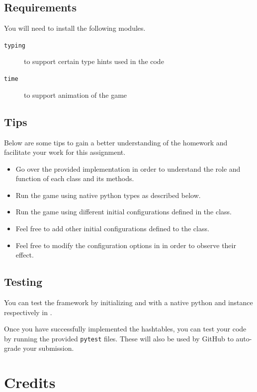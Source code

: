 \documentclass[addpoints]{exam}
\begin{document}
\subsection{Requirements}

You will need to install the following modules.
\begin{description}
\item [\texttt{typing}] to support certain type hints used in the code
\item [\texttt{time}] to support animation of the game
\end{description}

\subsection{Tips}

Below are some tips to gain a better understanding of the homework and facilitate your work for this assignment.
\begin{itemize}
\item Go over the provided implementation in order to understand the role and function of each class and its methods.
\item Run the game using native python types as described below.
\item Run the game using different initial configurations defined in the  class.
\item Feel free to add other initial configurations defined to the  class.
\item Feel free to modify the configuration options in  in order to observe their effect.
\end{itemize}

\subsection{Testing}

You can test the framework by initializing  and  with a native python  and  instance respectively in .

Once you have successfully implemented the hashtables, you can test your code by running the provided \texttt{pytest} files. These will also be used by GitHub to auto-grade your submission.
  
\section{Credits}
\end{document}

